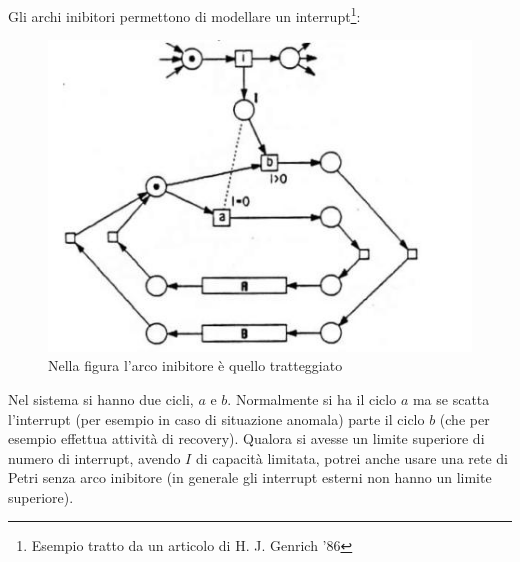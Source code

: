 \documentclass[a4paper,12pt, oneside]{book}
\begin{document}
\begin{esempio}
  Gli archi inibitori permettono di modellare un interrupt\footnote{Esempio
    tratto da un articolo di H. J. Genrich '86}:
  \begin{figure}[H]
    \centering
    \includegraphics[scale = 0.57]{img/inib8.jpg}
    \caption{Nella figura l'arco inibitore è quello tratteggiato}
  \end{figure}
  
  Nel sistema si hanno due cicli, $a$ e $b$. Normalmente si ha il ciclo $a$ ma
  se scatta l'interrupt (per esempio in caso di situazione anomala) parte il
  ciclo $b$ (che per esempio effettua attività di recovery). Qualora si avesse
  un limite superiore di numero di interrupt, avendo $I$ di capacità limitata,
  potrei anche usare una rete di Petri senza arco inibitore (in generale gli
  interrupt esterni non hanno un limite superiore).
\end{esempio}
\end{document}
